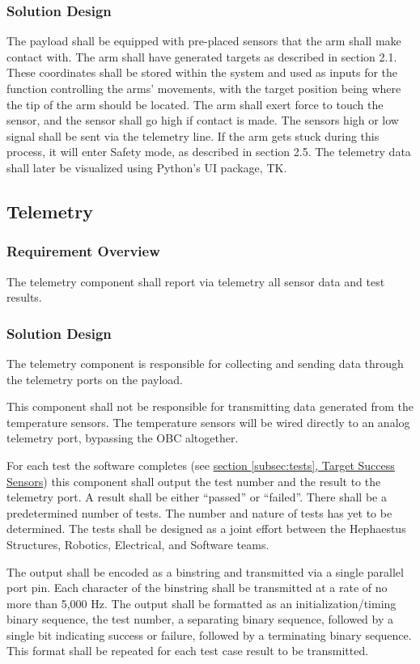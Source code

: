 \documentclass[letterpaper,10pt]{article}
\begin{document}
\subsubsection{Solution Design}
The payload shall be equipped with pre-placed sensors that the arm shall make contact with. The arm shall have generated targets
as described in section 2.1. These coordinates shall be stored within the system and used as inputs for the function controlling
the arms' movements, with the target position being where the tip of the arm should be located. The arm shall exert force to touch
the sensor, and the sensor shall go high if contact is made. The sensors high or low signal shall be sent via the telemetry
line. If the arm gets stuck during this process, it will enter Safety mode, as described in section 2.5. The telemetry data shall
later be visualized using Python's UI package, TK. 

\subsection{Telemetry}
\subsubsection{Requirement Overview}
The telemetry component shall report via telemetry all sensor data and test results.

\subsubsection{Solution Design}
The telemetry component is responsible for collecting and sending data through the
telemetry ports on the \gls{payload}.

This component shall not be responsible for transmitting data generated from the
temperature sensors.
The temperature sensors will be wired directly to an analog telemetry port,
bypassing the \gls{OBC} altogether.

For each test the software completes (see \hyperref[subsec:tests]{section 
\ref*{subsec:tests},  Target Success Sensors}) this component shall output the test
number and the result to the telemetry port.
A result shall be either ``passed'' or ``failed''.
There shall be a predetermined number of tests.
The number and nature of tests has yet to be determined.
The tests shall be designed as a joint effort between the Hephaestus Structures,
Robotics, Electrical, and Software teams.

The output shall be encoded as a \gls{binstring} and transmitted via a single parallel
port pin.
Each character of the \gls{binstring} shall be transmitted at a rate of no more
than 5,000 Hz.
The output shall be formatted as an initialization/timing binary sequence,
the test number, a separating binary sequence, followed by a single bit indicating
success or failure, followed by a terminating binary sequence.
This format shall be repeated for each test case result to be transmitted.
\end{document}
